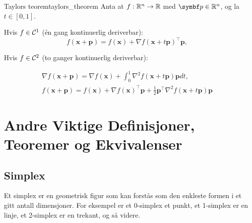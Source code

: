 \begin{theorem}{Taylors teorem}{taylors_theorem}
	Anta at \(f: \mathbb{R}^n \to \mathbb{R}\) med \(\mathbf{p}\in\R^n\), og la \(t\in[0,1]\).

	\medskip

	Hvis \(f\in\mathcal{C}^1\) (én gang kontinuerlig deriverbar):
	\[
		f(\mathbf{x} + \mathbf{p}) = f(\mathbf{x}) + \nabla f(\mathbf{x}+t\mathbf{p})^\top \mathbf{p},
	\]

	Hvis \(f \in \mathcal{C}^2\) (to ganger kontinuerlig deriverbar):

	\begin{align*}
		\nabla f(\mathbf{x} + \mathbf{p}) = \nabla f(\mathbf{x}) + \int_0^1 \nabla^2 f(\mathbf{x}+t\mathbf{p})\mathbf{p} dt, \\
		\boxed{f(\mathbf{x} + \mathbf{p}) = f(\mathbf{x}) + \nabla f(\mathbf{x})^\top \mathbf{p} + \frac{1}{2}\mathbf{p}^\top \nabla^2 f(\mathbf{x}+t\mathbf{p})\mathbf{p}}
	\end{align*}
\end{theorem}

\section{Andre Viktige Definisjoner, Teoremer og Ekvivalenser}

\subsection{Simplex}
Et simplex er en geometrisk figur som kan forstås som den enkleste formen i et gitt antall dimensjoner. For eksempel er et 0-simplex et punkt, et 1-simplex er en linje, et 2-simplex er en trekant, og så videre.

